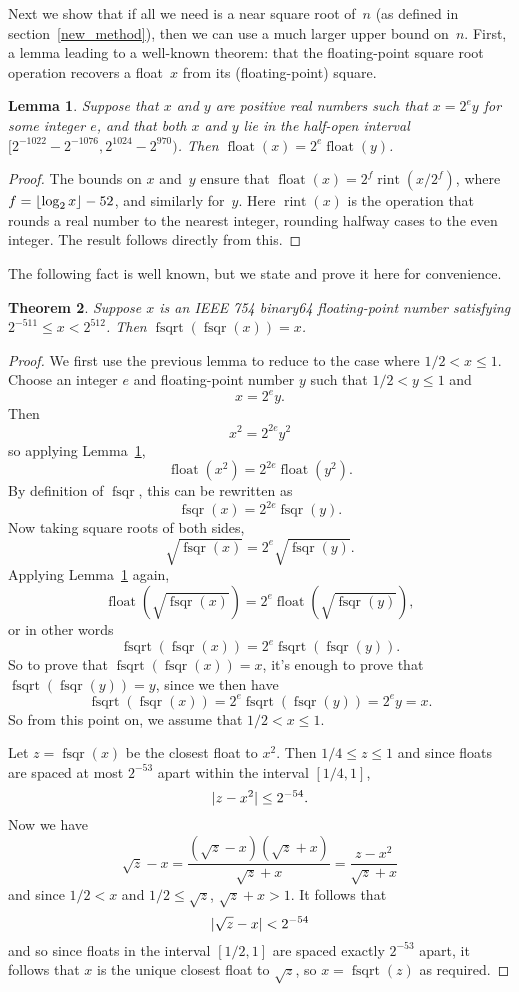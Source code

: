 \documentclass[a4paper]{article}
\DeclarePairedDelimiter\floor{\lfloor}{\rfloor}
\DeclarePairedDelimiter\abs{\lvert}{\rvert}
\DeclareMathOperator{\fsqrt}{fsqrt}
\DeclareMathOperator{\fsqr}{fsqr}
\DeclareMathOperator{\float}{float}
\DeclareMathOperator{\rint}{rint}
\theoremstyle{plain}
\newtheorem{theorem}{Theorem}
\newtheorem{lemma}[theorem]{Lemma}
\theoremstyle{definition}
\begin{document}
Next we show that if all we need is a near square root of~$n$ (as defined in
section~\ref{new_method}), then we can use a much larger upper bound on~$n$.
First, a lemma leading to a well-known theorem: that the floating-point
square root operation recovers a float~$x$ from its (floating-point) square.

\begin{lemma}\label{float_scale}
  Suppose that $x$ and $y$ are positive real numbers such that $x = 2^e y$ for
  some integer $e$, and that both $x$ and $y$ lie in the half-open interval
  $[2^{-1022} - 2^{-1076}, 2^{1024} - 2^{970})$. Then $\float(x) = 2^e
  \float(y)$.
\end{lemma}

\begin{proof}
  The bounds on $x$ and~$y$ ensure that $\float(x) = 2^f \rint(x / 2^f)$, where
  $f = \floor{\log_2 x} - 52$, and similarly for~$y$. Here $\rint(x)$ is the
  operation that rounds a real number to the nearest integer, rounding halfway
  cases to the even integer. The result follows directly from this.
\end{proof}

The following fact is well known, but we state and prove it here for
convenience.

\begin{theorem}\label{sqrt_of_sqr}
  Suppose $x$ is an IEEE 754 binary64 floating-point number satisfying
  $2^{-511} \le x < 2^{512}$. Then $\fsqrt(\fsqr(x)) = x$.
\end{theorem}

\begin{proof}
  We first use the previous lemma to reduce to the case where $1/2 < x \le 1$.
  Choose an integer $e$ and floating-point number $y$ such that $1/2 < y \le 1$
  and
  $$x = 2^e y.$$
  Then
  $$x^2 = 2^{2e}y^2$$
  so applying Lemma~\ref{float_scale},
  $$\float(x^2) = 2^{2e}\float(y^2).$$
  By definition of $\fsqr$, this can be rewritten as
  $$\fsqr(x) = 2^{2e}\fsqr(y).$$
  Now taking square roots of both sides,
  $$\sqrt{\fsqr(x)} = 2^e \sqrt{\fsqr(y)}.$$
  Applying Lemma~\ref{float_scale} again,
  $$\float(\sqrt{\fsqr(x)}) = 2^e \float(\sqrt{\fsqr(y)}),$$
  or in other words
  $$\fsqrt(\fsqr(x)) = 2^e \fsqrt(\fsqr(y)).$$
  So to prove that $\fsqrt(\fsqr(x)) = x$, it's enough to prove that
  $\fsqrt(\fsqr(y)) = y$, since we then have
  $$\fsqrt(\fsqr(x)) = 2^e \fsqrt(\fsqr(y)) = 2^e y = x.$$
  So from this point on, we assume that $1/2 < x \le 1$.

  Let $z = \fsqr(x)$ be the closest float to $x^2$. Then $1/4 \le z \le 1$ and
  since floats are spaced at most $2^{-53}$ apart within the interval $[1/4,
  1]$,
  $$\abs{z - x^2} \le 2^{-54}.$$ Now we have
  $$\sqrt z - x = \frac{(\sqrt z - x)(\sqrt z + x)}{\sqrt z + x} = \frac{z -
  x^2}{\sqrt z + x}$$ and since $1/2 < x$ and $1/2 \le \sqrt z $, $\sqrt z + x
  > 1$. It follows that
  $$\abs{\sqrt z - x} < 2^{-54}$$ and so since floats in the interval $[1/2,
  1]$ are spaced exactly $2^{-53}$ apart, it follows that $x$ is the unique
  closest float to $\sqrt z$, so $x = \fsqrt(z)$ as required.
\end{proof}
\end{document}
